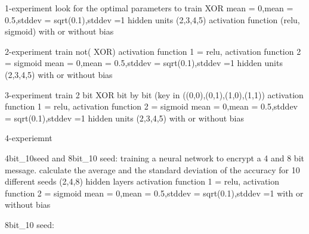 1-experiment
look for the optimal parameters to train XOR
mean = 0,mean = 0.5,stddev = sqrt(0.1),stddev =1
hidden units (2,3,4,5)
activation function (relu, sigmoid)
with or without bias


2-experiment
train not( XOR)
activation function 1 = relu, activation function 2 = sigmoid 
mean = 0,mean = 0.5,stddev = sqrt(0.1),stddev =1
hidden units (2,3,4,5)
with or without bias

3-experiment
train 2 bit XOR bit by bit (key in ((0,0),(0,1),(1,0),(1,1))
activation function 1 = relu, activation function 2 = sigmoid 
mean = 0,mean = 0.5,stddev = sqrt(0.1),stddev =1
hidden units (2,3,4,5)
with or without bias

4-experiemnt


4bit_10seed and 8bit_10 seed:
training a neural network to encrypt  a 4 and 8 bit message. 
calculate the average and the standard deviation of the accuracy for 10 different seeds 
(2,4,8) hidden layers
activation function 1 = relu, activation function 2 = sigmoid 
mean = 0,mean = 0.5,stddev = sqrt(0.1),stddev =1
with or without bias


8bit_10 seed:







